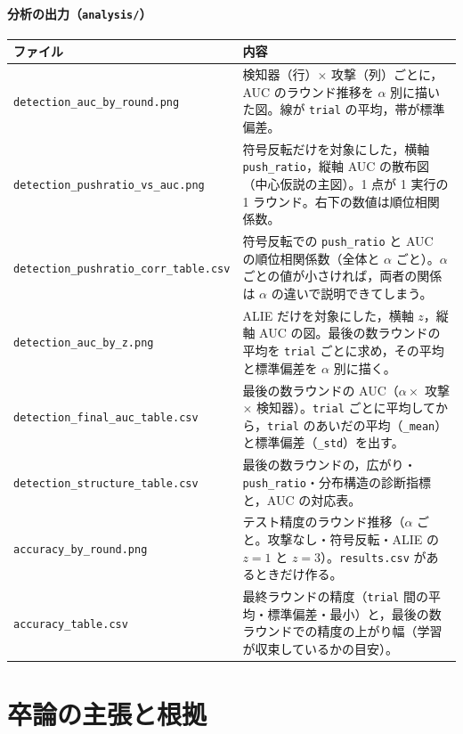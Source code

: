 \documentclass[a4j, dvipdfmx]{jsarticle}  %
\begin{document}
\subsection{分析の出力（\texttt{analysis/}）}

\begin{table}[H]
\centering
\begin{tabular}{@{}P{5.6cm} P{9.7cm}@{}}
\toprule
ファイル & 内容 \\
\midrule
\texttt{detection\_auc\_by\_round.png} & 検知器（行）$\times$ 攻撃（列）ごとに，AUC のラウンド推移を $\alpha$ 別に描いた図。線が \texttt{trial} の平均，帯が標準偏差。 \\
\texttt{detection\_pushratio\_vs\_auc.png} & 符号反転だけを対象にした，横軸 \texttt{push\_ratio}，縦軸 AUC の散布図（中心仮説の主図）。1 点が 1 実行の 1 ラウンド。右下の数値は順位相関係数。 \\
\texttt{detection\_pushratio\_}\allowbreak\texttt{corr\_table.csv} & 符号反転での \texttt{push\_ratio} と AUC の順位相関係数（全体と $\alpha$ ごと）。$\alpha$ ごとの値が小さければ，両者の関係は $\alpha$ の違いで説明できてしまう。 \\
\texttt{detection\_auc\_by\_z.png} & ALIE だけを対象にした，横軸 $z$，縦軸 AUC の図。最後の数ラウンドの平均を \texttt{trial} ごとに求め，その平均と標準偏差を $\alpha$ 別に描く。 \\
\texttt{detection\_final\_auc\_table.csv} & 最後の数ラウンドの AUC（$\alpha \times$ 攻撃 $\times$ 検知器）。\texttt{trial} ごとに平均してから，\texttt{trial} のあいだの平均（\texttt{\_mean}）と標準偏差（\texttt{\_std}）を出す。 \\
\texttt{detection\_structure\_table.csv} & 最後の数ラウンドの，広がり・\texttt{push\_ratio}・分布構造の診断指標と，AUC の対応表。 \\
\texttt{accuracy\_by\_round.png} & テスト精度のラウンド推移（$\alpha$ ごと。攻撃なし・符号反転・ALIE の $z=1$ と $z=3$）。\texttt{results.csv} があるときだけ作る。 \\
\texttt{accuracy\_table.csv} & 最終ラウンドの精度（\texttt{trial} 間の平均・標準偏差・最小）と，最後の数ラウンドでの精度の上がり幅（学習が収束しているかの目安）。 \\
\bottomrule
\end{tabular}
\end{table}

\part{卒論の主張と根拠}
\label{part:claims}
\end{document}
